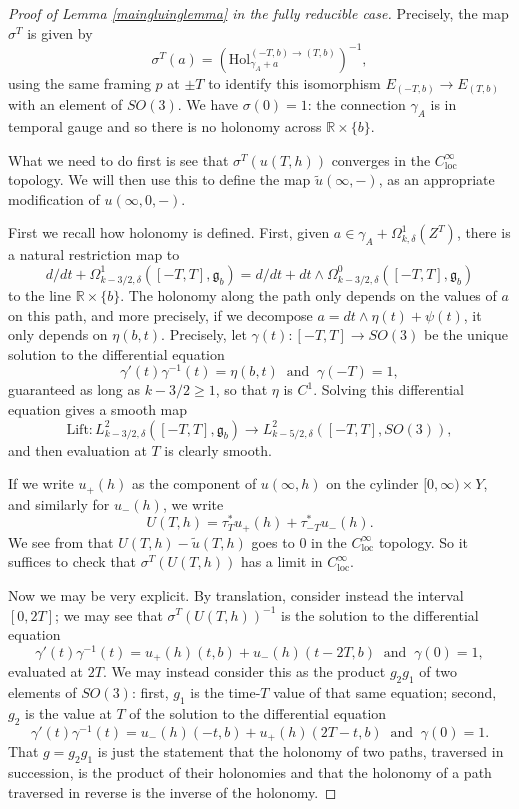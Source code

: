 \documentclass{memo-l}
\theoremstyle{definition}
\theoremstyle{remark}
\numberwithin{section}{chapter}
\numberwithin{equation}{chapter}
\begin{document}
\begin{proof}[Proof of Lemma \ref{maingluinglemma} in the fully reducible case]
Precisely, the map $\sigma^T$ is given by $$\sigma^T(a) = \left(\text{Hol}_{\gamma_A + a}^{(-T,b) \to (T,b)}\right)^{-1},$$ using the same framing $p$ at $\pm T$ to identify this isomorphism $E_{(-T,b)} \to E_{(T, b)}$ with an element of $SO(3)$. We have $\sigma(0) = 1$: the connection $\gamma_A$ is in temporal gauge and so there is no holonomy across $\mathbb R \times \{b\}$.

What we need to do first is see that $\sigma^T(u(T, h))$ converges in the $C^\infty_{\text{loc}}$ topology. We will then use this to define the map $\widetilde u(\infty, -)$, as an appropriate modification of $u(\infty, 0, -)$.

First we recall how holonomy is defined. First, given $a \in \gamma_A + \Omega^1_{k,\delta}(Z^T)$, there is a natural restriction map to $$d/dt + \Omega^1_{k-3/2,\delta}([-T, T], \mathfrak g_b) = d/dt + dt \wedge \Omega^0_{k-3/2, \delta}([-T, T], \mathfrak g_b)$$ to the line $\mathbb R \times \{b\}$. The holonomy along the path only depends on the values of $a$ on this path, and more precisely, if we decompose $a = dt \wedge \eta(t) + \psi(t)$, it only depends on $\eta(b,t)$. Precisely, let $\gamma(t): [-T, T] \to SO(3)$ be the unique solution to the differential equation 
$$\gamma'(t) \gamma^{-1}(t) = \eta(b,t) \;\; \text{and} \;\; \gamma(-T) = 1,$$ 
guaranteed as long as $k-3/2 \geq 1$, so that $\eta$ is $C^1$. Solving this differential equation gives a smooth map 
$$\text{Lift}: L^2_{k-3/2,\delta}([-T, T], \mathfrak g_b) \to L^2_{k-5/2,\delta}([-T, T], SO(3)),$$ 
and then evaluation at $T$ is clearly smooth.

If we write $u_+(h)$ as the component of $u(\infty, h)$ on the cylinder $[0,\infty) \times Y$, and similarly for $u_-(h)$, we write 
$$U(T, h) = \tau_T^*u_+(h) + \tau_{-T}^* u_-(h).$$ 
We see from \cite[Lemma~3.5.19]{Lin} that $U(T, h) - \widetilde u(T, h)$ goes to $0$ in the $C^\infty_{\text{loc}}$ topology. So it suffices to check that $\sigma^T(U(T, h))$ has a limit in $C^\infty_{\text{loc}}.$

Now we may be very explicit. By translation, consider instead the interval $[0, 2T]$; we may see that $\sigma^T(U(T, h))^{-1}$ is the solution to the differential equation $$\gamma'(t) \gamma^{-1}(t) = u_+(h)(t,b) + u_-(h)(t-2T,b)\;\; \text{and} \;\; \gamma(0) = 1,$$ evaluated at $2T$. We may instead consider this as the product $g_2 g_1$ of two elements of $SO(3)$: first, $g_1$ is the time-$T$ value of that same equation; second, $g_2$ is the value at $T$ of the solution to the differential equation 
$$\gamma'(t) \gamma^{-1}(t) = u_-(h)(-t,b) + u_+(h)(2T-t,b) \;\; \text{and} \;\; \gamma(0) = 1.$$
That $g = g_2 g_1$ is just the statement that the holonomy of two paths, traversed in succession, is the product of their holonomies and that the holonomy of a path traversed in reverse is the inverse of the holonomy.


\end{proof}
\end{document}
